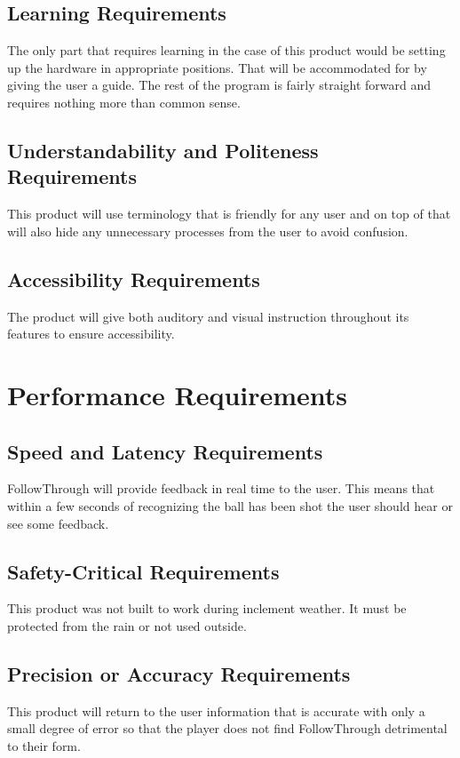\subsection{Learning Requirements}
\hspace*{4mm}The only part that requires learning in the case of this product would be setting up the hardware in appropriate positions. That will be accommodated for by giving the user a guide. The rest of the program is fairly straight forward and requires nothing more than common sense.
 
\subsection{Understandability and Politeness Requirements}
\hspace*{4mm}This product will use terminology that is friendly for any user and on top of that will also hide any unnecessary processes from the user to avoid confusion.
 
\subsection{Accessibility Requirements}
\hspace*{4mm}The product will give both auditory and visual instruction throughout its features to ensure accessibility.
 
\section{Performance Requirements}
\subsection{Speed and Latency Requirements}
\hspace*{4mm}FollowThrough will provide feedback in real time to the user. This means that within a few seconds of recognizing the ball has been shot the user should hear or see some feedback.
 
\subsection{Safety-Critical Requirements}
\hspace*{4mm}This product was not built to work during inclement weather. It must be protected from the rain or not used outside.
 
\subsection{Precision or Accuracy Requirements}
\hspace*{4mm}This product will return to the user information that is accurate with only a small degree of error so that the player does not find FollowThrough detrimental to their form.
 
